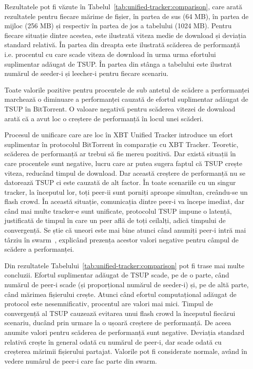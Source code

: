 Rezultatele pot fi văzute în Tabelul~\ref{tab:unified-tracker:comparison}, care arată rezultatele pentru fiecare mărime de fișier, în partea de sus (64 MB), în partea de mijloc (256 MB) și respectiv în partea de jos a tabelului (1024 MB). Pentru fiecare situație dintre acestea, este ilustrată viteza medie de download și deviația standard relativă. În partea din dreapta este ilustrată scăderea de performanță i.e. procentul cu care scade viteza de download în urma urma efortului suplimentar adăugat de TSUP. În partea din stânga a tabelului este ilustrat numărul de seeder-i și leecher-i pentru fiecare scenariu.

Toate valorile pozitive pentru procentele de sub antetul de scădere a performanței marchează o diminuare a performanței cauzată de efortul suplimentar adăugat de TSUP în BitTorrent. O valoare negativă pentru scăderea vitezei de download arată că a avut loc o creștere de performanță în locul unei scăderi.

Procesul de unificare care are loc în XBT Unified Tracker introduce un efort suplimentar în protocolul BitTorrent în comparație cu XBT Tracker. Teoretic, scăderea de performanță ar trebui să fie mereu pozitivă. Dar există situații în care procentele sunt negative, lucru care ar putea sugera faptul că TSUP crește viteza, reducând timpul de download. Dar această creștere de performanță nu se datorează TSUP ci este cauzată de alt factor. În toate scenariile cu un singur tracker, la începutul lor, toți peer-ii sunt porniți aproape simultan, creându-se un flash crowd.  În această situație, comunicația dintre peer-i va începe imediat, dar când mai multe tracker-e sunt unificate, protocolul TSUP impune o latență, justificată de timpul în care un peer află de toți ceilalți, adică timpului de convergență. Se știe că uneori este mai bine atunci când anumiți peer-i intră mai târziu în swarm~\cite{bt-analysis}, explicând prezența acestor valori negative pentru câmpul de scădere a performanței.



Din rezultatele Tabelului~\ref{tab:unified-tracker:comparison} pot fi trase mai multe concluzii. Efortul suplimentar adăugat de TSUP scade, pe de o parte, când numărul de peer-i scade (și proporțional numărul de seeder-i) și, pe de altă parte, când mărimea fișierului crește. Atunci când efortul computațional adăugat de protocol este nesemnificativ, procentul are valori mai mici. Timpul de convergență al TSUP cauzează evitarea unui flash crowd la începutul fiecărui scenariu, ducând prin urmare la o ușoară creștere de performanță. De aceea  anumite valori pentru scăderea de performanță sunt negative. Deviația standard relativă crește în general odată cu numărul de peer-i, dar scade odată cu creșterea mărimii fișierului partajat. Valorile pot fi considerate normale, având în vedere numârul de peer-i care fac parte din swarm.
